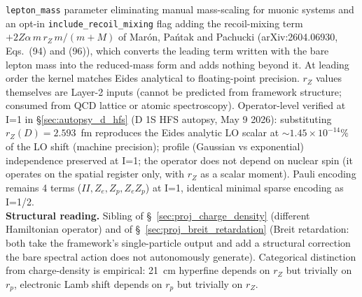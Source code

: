 \documentclass[11pt]{article}
\begin{document}
\texttt{lepton\_mass} parameter eliminating manual mass-scaling for
muonic systems and an opt-in \texttt{include\_recoil\_mixing} flag
adding the recoil-mixing term $+2Z\alpha\, m\, r_Z\, m/(m+M)$ of
Mar\'on, Pa\'ntak and Pachucki (arXiv:2604.06930, Eqs.~(94) and (96)),
which converts the leading term written with the bare lepton mass into
the reduced-mass form and adds nothing beyond it.  At leading order the
kernel matches Eides analytical to floating-point precision.  $r_Z$ values themselves are Layer-2 inputs
(cannot be predicted from framework structure; consumed from QCD
lattice or atomic spectroscopy).  Operator-level verified at I=1 in
\S\ref{sec:autopsy_d_hfs} (D 1S HFS autopsy, May 9 2026):
substituting $r_Z(D) = 2.593$~fm reproduces the Eides analytic LO
scalar at $\sim 1.45 \times 10^{-14}\%$ of the LO shift (machine
precision); profile (Gaussian vs exponential) independence preserved
at I=1; the operator does not depend on nuclear spin (it operates
on the spatial register only, with $r_Z$ as a scalar moment).  Pauli
encoding remains 4 terms ($II, Z_e, Z_p, Z_e Z_p$) at I=1, identical
minimal sparse encoding as I=1/2.\\
\textbf{Structural reading.}  Sibling of
\S~\ref{sec:proj_charge_density} (different Hamiltonian operator)
and of \S~\ref{sec:proj_breit_retardation} (Breit retardation:
both take the framework's single-particle output and add a
structural correction the bare spectral action does not
autonomously generate).  Categorical distinction from
charge-density is empirical: 21~cm hyperfine depends on $r_Z$ but
trivially on $r_p$, electronic Lamb shift depends on $r_p$ but
trivially on $r_Z$.
\end{document}
